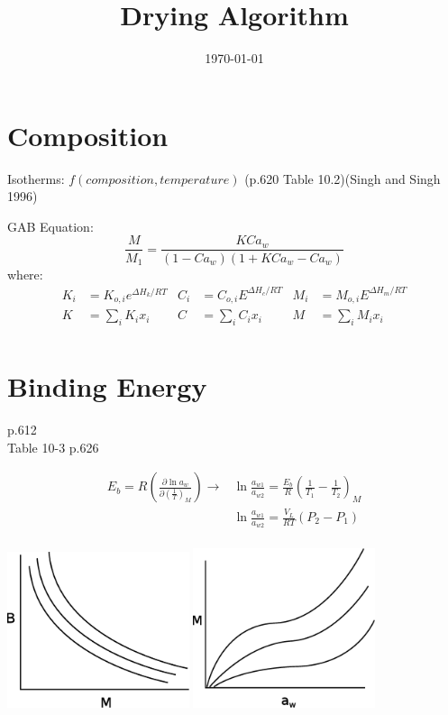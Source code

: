 \documentclass[11pt]{article}
\begin{document}
\title{Drying Algorithm}
\date{\today}
\maketitle

\section{Composition}
Isotherms: $f(composition, temperature)$ (p.620 Table 10.2)(Singh and Singh  1996)

GAB Equation:
\[ \frac{M}{M_1} = \frac{K C a_w}{(1-C a_w)(1 + K C a_w - C a_w)} \]
where:
\begin{align*}
K_i&=K_{o,i} e^{\Delta H_k/RT} & C_i&=C_{o,i} E^{\Delta H_c/RT} & M_i&=M_{o,i} E^{\Delta H_m/RT}\\
K&=\sum_i K_i x_i & C&=\sum_i C_i x_i & M&=\sum_i M_i x_i\\
\end{align*}

\section{Binding Energy}
p.612\\
Table 10-3 p.626

\begin{align*}
E_b = R\left(\frac{\partial\ln a_w}{\partial\left(\frac{1}{T}\right)_M}\right) \rightarrow &\ln\frac{a_{w1}}{a_{w2}} = \frac{E_b}{R}\left(\frac{1}{T_1}-\frac{1}{T_2}\right)_M \\
& \ln\frac{a_{w1}}{a_{w2}} = \frac{V_L}{RT}(P_2-P_1) \\
\end{align*}

\begin{center}
\includegraphics[width=0.4\textwidth]{pics/eps/binding_energy_1}
\includegraphics[width=0.4\textwidth]{pics/eps/binding_energy_2}
\end{center}
\end{document}
